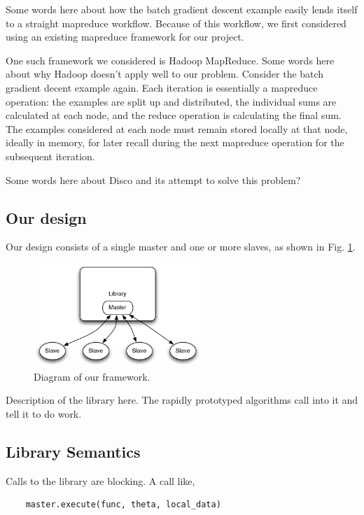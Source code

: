 \documentclass[%
        final,
        notitlepage,
        narroweqnarray,
        inline,
        ]{ieee}
\begin{document}
Some words here about how the batch gradient descent example easily lends
itself to a straight mapreduce workflow. Because of this workflow, we first
considered using an existing mapreduce framework for our project.

One such framework we considered is Hadoop MapReduce. Some words here about why
Hadoop doesn't apply well to our problem. Consider the batch gradient decent
example again. Each iteration is essentially a mapreduce operation: the
examples are split up and distributed, the individual sums are calculated at
each node, and the reduce operation is calculating the final sum. The examples
considered at each node must remain stored locally at that node, ideally in
memory, for later recall during the next mapreduce operation for the subsequent
iteration.

Some words here about Disco and its attempt to solve this problem?

\subsection{Our design}

Our design consists of a single master and one or more slaves, as shown in
Fig. \ref{diagram}.

\begin{figure}[hb]
  \begin{center}
    \includegraphics[width=2.5in]{fwk_diagram/fwk_diagram.pdf}
  \end{center}
  \caption{Diagram of our framework.}
  \label{diagram}
\end{figure}

Description of the library here. The rapidly prototyped algorithms call into it
and tell it to do work.

\subsection{Library Semantics}

Calls to the library are blocking. A call like,

\begin{verbatim}
    master.execute(func, theta, local_data)
\end{verbatim}
\end{document}

